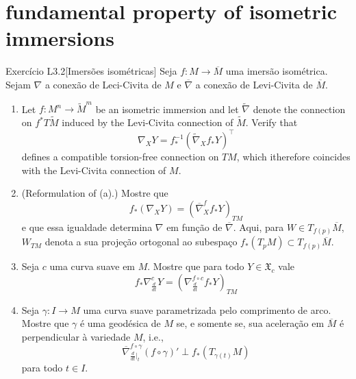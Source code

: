 \section{fundamental property of isometric immersions}

\begin{thing6}{Exercício L3.2}[Imersões isométricas]\label{exer:L3.2}\leavevmode
Seja \(f:M \to \overline{M}\) uma imersão isométrica. Sejam \(\nabla\) a conexão de Leci-Civita de \(M\) e \(\overline{\nabla}\) a conexão de Levi-Civita de \(\overline{M}\).
\begin{enumerate}[label=(\alph*)]
\item Let \(f:M^n \to \widetilde{M}^m\) be an isometric immersion and let \(\widetilde{\nabla}\) denote the connection on \(f^*T \widetilde{M}\) induced by the Levi-Civita connection of \(\widetilde{M}\). Verify that
	\[\nabla_XY=f^{-1}_*\left(\widetilde{\nabla}_X f_*Y\right)^\top\]
defines a compatible torsion-free connection on \(TM\), which itherefore coincides with the Levi-Civita connection of \(M\).	

\item  (Reformulation of (a).) Mostre que
	\[f_*(\nabla_XY)=\left(\overline{\nabla}^f_Xf_*Y\right)_{TM}\]
e que essa igualdade determina \(\nabla\) em função de \(\overline{\nabla}\). Aqui, para \(W \in T_{f(p)}\overline{M}\), \(W_{TM}\) denota a sua projeção ortogonal ao subespaço \(f_*(T_pM) \subset T_{f(p)}\overline{M}\).
\item Seja \(c\) uma curva suave em \(M\). Mostre que para todo \(Y \in \mathfrak{X}_c\) vale
	\[f_*\nabla^c_{\frac{d}{dt}}Y=\left(\nabla^{f \circ c}_{\frac{d}{dt}}f_*Y\right)_{TM} \]
\item Seja \(\gamma:I \to M\) uma curva suave parametrizada pelo comprimento de arco. Mostre que \(\gamma\) é uma geodésica de \(M\) se, e somente se, sua aceleração em \(\overline{M}\) é perpendicular à variedade \(M\), i.e.,
	\[\overline{\nabla}^{f \circ \gamma}_{\frac{d}{dt}\Big|_{t}}(f \circ \gamma)' \perp f_*(T_{\gamma(t)}M)\]
	para todo \(t \in I\).
\end{enumerate}
\end{thing6}

